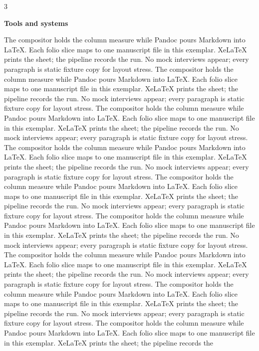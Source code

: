 \documentclass[
]{article}
\begin{document}
\begin{multicols}{3}

\textbf{Tools and systems}

The compositor holds the column measure while Pandoc pours Markdown into
LaTeX. Each folio slice maps to one manuscript file in this exemplar.
XeLaTeX prints the sheet; the pipeline records the run. No mock
interviews appear; every paragraph is static fixture copy for layout
stress. The compositor holds the column measure while Pandoc pours
Markdown into LaTeX. Each folio slice maps to one manuscript file in
this exemplar. XeLaTeX prints the sheet; the pipeline records the run.
No mock interviews appear; every paragraph is static fixture copy for
layout stress. The compositor holds the column measure while Pandoc
pours Markdown into LaTeX. Each folio slice maps to one manuscript file
in this exemplar. XeLaTeX prints the sheet; the pipeline records the
run. No mock interviews appear; every paragraph is static fixture copy
for layout stress. The compositor holds the column measure while Pandoc
pours Markdown into LaTeX. Each folio slice maps to one manuscript file
in this exemplar. XeLaTeX prints the sheet; the pipeline records the
run. No mock interviews appear; every paragraph is static fixture copy
for layout stress. The compositor holds the column measure while Pandoc
pours Markdown into LaTeX. Each folio slice maps to one manuscript file
in this exemplar. XeLaTeX prints the sheet; the pipeline records the
run. No mock interviews appear; every paragraph is static fixture copy
for layout stress. The compositor holds the column measure while Pandoc
pours Markdown into LaTeX. Each folio slice maps to one manuscript file
in this exemplar. XeLaTeX prints the sheet; the pipeline records the
run. No mock interviews appear; every paragraph is static fixture copy
for layout stress. The compositor holds the column measure while Pandoc
pours Markdown into LaTeX. Each folio slice maps to one manuscript file
in this exemplar. XeLaTeX prints the sheet; the pipeline records the
run. No mock interviews appear; every paragraph is static fixture copy
for layout stress. The compositor holds the column measure while Pandoc
pours Markdown into LaTeX. Each folio slice maps to one manuscript file
in this exemplar. XeLaTeX prints the sheet; the pipeline records the
run. No mock interviews appear; every paragraph is static fixture copy
for layout stress. The compositor holds the column measure while Pandoc
pours Markdown into LaTeX. Each folio slice maps to one manuscript file
in this exemplar. XeLaTeX prints the sheet; the pipeline records the

\end{multicols}
\end{document}
